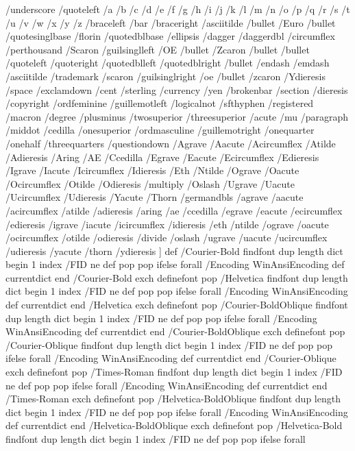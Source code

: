 /underscore /quoteleft /a /b /c
/d /e /f /g /h
/i /j /k /l /m
/n /o /p /q /r
/s /t /u /v /w
/x /y /z /braceleft /bar
/braceright /asciitilde /bullet /Euro /bullet
/quotesinglbase /florin /quotedblbase /ellipsis /dagger
/daggerdbl /circumflex /perthousand /Scaron /guilsinglleft
/OE /bullet /Zcaron /bullet /bullet
/quoteleft /quoteright /quotedblleft /quotedblright /bullet
/endash /emdash /asciitilde /trademark /scaron
/guilsinglright /oe /bullet /zcaron /Ydieresis
/space /exclamdown /cent /sterling /currency
/yen /brokenbar /section /dieresis /copyright
/ordfeminine /guillemotleft /logicalnot /sfthyphen /registered
/macron /degree /plusminus /twosuperior /threesuperior
/acute /mu /paragraph /middot /cedilla
/onesuperior /ordmasculine /guillemotright /onequarter /onehalf
/threequarters /questiondown /Agrave /Aacute /Acircumflex
/Atilde /Adieresis /Aring /AE /Ccedilla
/Egrave /Eacute /Ecircumflex /Edieresis /Igrave
/Iacute /Icircumflex /Idieresis /Eth /Ntilde
/Ograve /Oacute /Ocircumflex /Otilde /Odieresis
/multiply /Oslash /Ugrave /Uacute /Ucircumflex
/Udieresis /Yacute /Thorn /germandbls /agrave
/aacute /acircumflex /atilde /adieresis /aring
/ae /ccedilla /egrave /eacute /ecircumflex
/edieresis /igrave /iacute /icircumflex /idieresis
/eth /ntilde /ograve /oacute /ocircumflex
/otilde /odieresis /divide /oslash /ugrave
/uacute /ucircumflex /udieresis /yacute /thorn
/ydieresis
] def
/Courier-Bold findfont
dup length dict begin
  {1 index /FID ne {def} {pop pop} ifelse} forall
  /Encoding WinAnsiEncoding def
  currentdict
end
/Courier-Bold exch definefont pop
/Helvetica findfont
dup length dict begin
  {1 index /FID ne {def} {pop pop} ifelse} forall
  /Encoding WinAnsiEncoding def
  currentdict
end
/Helvetica exch definefont pop
/Courier-BoldOblique findfont
dup length dict begin
  {1 index /FID ne {def} {pop pop} ifelse} forall
  /Encoding WinAnsiEncoding def
  currentdict
end
/Courier-BoldOblique exch definefont pop
/Courier-Oblique findfont
dup length dict begin
  {1 index /FID ne {def} {pop pop} ifelse} forall
  /Encoding WinAnsiEncoding def
  currentdict
end
/Courier-Oblique exch definefont pop
/Times-Roman findfont
dup length dict begin
  {1 index /FID ne {def} {pop pop} ifelse} forall
  /Encoding WinAnsiEncoding def
  currentdict
end
/Times-Roman exch definefont pop
/Helvetica-BoldOblique findfont
dup length dict begin
  {1 index /FID ne {def} {pop pop} ifelse} forall
  /Encoding WinAnsiEncoding def
  currentdict
end
/Helvetica-BoldOblique exch definefont pop
/Helvetica-Bold findfont
dup length dict begin
  {1 index /FID ne {def} {pop pop} ifelse} forall
